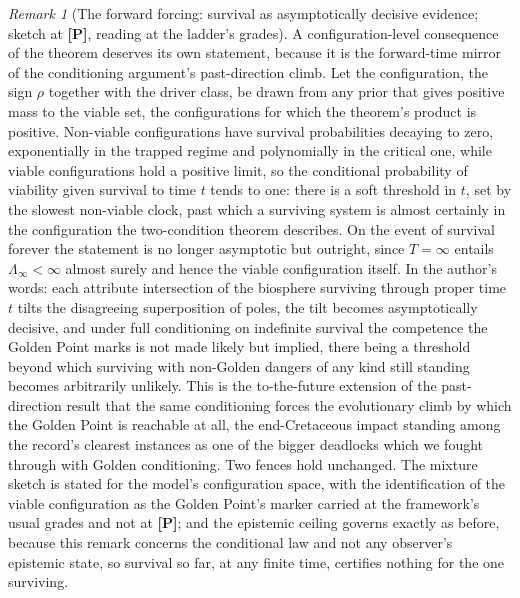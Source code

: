 \documentclass[11pt]{article}
\theoremstyle{plain}
\theoremstyle{definition}
\theoremstyle{remark}
\newtheorem{remark}[theorem]{Remark}
\begin{document}
\begin{remark}[The forward forcing: survival as asymptotically
decisive evidence; sketch at \textbf{[P]}, reading at the ladder's
grades]\label{gr1:rem:forwardforcing}
A configuration-level consequence of the theorem deserves its own
statement, because it is the forward-time mirror of the conditioning
argument's past-direction climb. Let the configuration, the sign
$\rho$ together with the driver class, be drawn from any prior that
gives positive mass to the viable set, the configurations for which
the theorem's product is positive. Non-viable configurations have
survival probabilities decaying to zero, exponentially in the trapped
regime and polynomially in the critical one, while viable
configurations hold a positive limit, so the conditional probability
of viability given survival to time $t$ tends to one: there is a soft
threshold in $t$, set by the slowest non-viable clock, past which a
surviving system is almost certainly in the configuration the
two-condition theorem describes. On the event of survival forever the
statement is no longer asymptotic but outright, since $T=\infty$
entails $\Lambda_\infty<\infty$ almost surely and hence the viable
configuration itself. In the author's words: each attribute
intersection of the biosphere surviving through proper time $t$ tilts
the disagreeing superposition of poles, the tilt becomes
asymptotically decisive, and under full conditioning on indefinite
survival the competence the Golden Point marks is not made likely but
implied, there being a threshold beyond which surviving with
non-Golden dangers of any kind still standing becomes arbitrarily
unlikely. This is the to-the-future extension of the past-direction
result that the same conditioning forces the evolutionary climb by
which the Golden Point is reachable at all, the end-Cretaceous impact
standing among the record's clearest instances as one of the bigger
deadlocks which we fought through with Golden conditioning. Two fences hold
unchanged. The mixture sketch is stated for the model's configuration
space, with the identification of the viable configuration as the
Golden Point's marker carried at the framework's usual grades and not
at \textbf{[P]}; and the epistemic ceiling governs exactly as before,
because this remark concerns the conditional law and not any
observer's epistemic state, so survival so far, at any finite time,
certifies nothing for the one surviving.
\end{remark}
\end{document}
